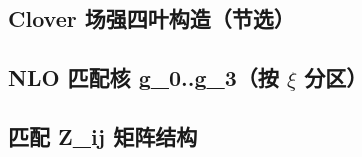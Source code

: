 \documentclass[UTF8]{ctexart}
\begin{document}
\subsection{Clover 场强四叶构造（节选）}


\subsection{NLO 匹配核 g\_0..g\_3（按 $\xi$ 分区）}


\subsection{匹配 Z\_ij 矩阵结构}


\end{document}
